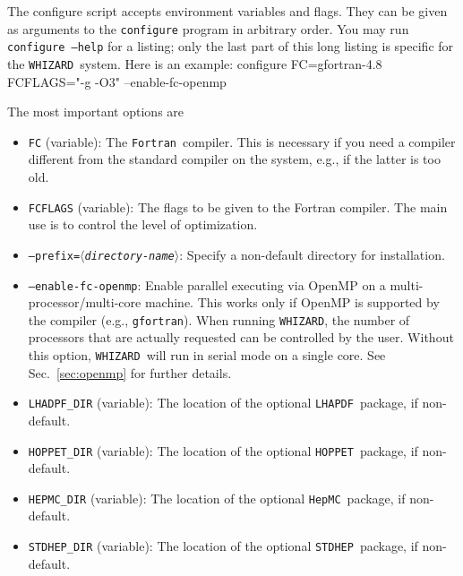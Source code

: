 \documentclass[12pt]{book}
\newenvironment{interaction}%
  {\begingroup\small
   \verbatim}%
  {\endverbatim
   \endgroup\noindent}
\newcommand{\var}[1]{$\langle$\textit{#1}$\rangle$}
\newcommand{\ttt}[1]{\texttt{#1}}
\newcommand{\whizard}{\texttt{WHIZARD}}
\newcommand{\stdhep}{\texttt{STDHEP}}
\newcommand{\lhapdf}{\texttt{LHAPDF}}
\newcommand{\hepmc}{\texttt{HepMC}}
\newcommand{\hoppet}{\texttt{HOPPET}}
\newcommand{\fortran}{\texttt{Fortran}}
\begin{document}
The configure script accepts environment variables and flags.  They
can be given as arguments to the \ttt{configure} program in arbitrary
order.  You may run \ttt{configure --help} for a listing; only the
last part of this long listing is specific for the \whizard\ system.
Here is an example:
\begin{interaction}
  configure  FC=gfortran-4.8  FCFLAGS="-g -O3"  --enable-fc-openmp
\end{interaction}

The most important options are
\begin{itemize}
\item
  \ttt{FC} (variable): The \fortran\ compiler.  This is necessary if
  you need a compiler different from the standard compiler on the
  system, e.g., if the latter is too old.
\item
  \ttt{FCFLAGS} (variable): The flags to be given to the Fortran
  compiler.  The main use is to control the level of optimization.
\item
  \ttt{--prefix=\var{directory-name}}: Specify a non-default directory
  for installation.
\item
  \ttt{--enable-fc-openmp}: Enable parallel executing via OpenMP on a
  multi-processor/multi-core machine.  This works only if OpenMP is
  supported by the compiler (e.g., \ttt{gfortran}).  When running
  \whizard, the number of processors that are actually requested can
  be controlled by the user.  Without this option, \whizard\ will run
  in serial mode on a single core.  See Sec.~\ref{sec:openmp} for
  further details.
\item
  \ttt{LHADPF\_DIR} (variable): The location of the optional \lhapdf\
  package, if non-default.
\item
  \ttt{HOPPET\_DIR} (variable): The location of the optional \hoppet\
  package, if non-default.
\item
  \ttt{HEPMC\_DIR} (variable): The location of the optional \hepmc\ package, if
  non-default.
\item
  \ttt{STDHEP\_DIR} (variable): The location of the optional \stdhep\
  package, if non-default.
\end{itemize}
\end{document}
